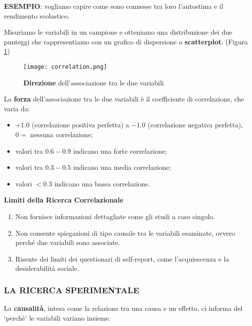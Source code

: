 \documentclass{subfiles}
\begin{document}
        \textbf{ESEMPIO}: vogliamo capire come sono connesse tra loro l'autostima e il rendimento 
        scolastico.

        Misuriamo le variabili in un campione e otteniamo una distribuzione dei due punteggi che 
        rappresentiamo con un grafico di dispersione o \textbf{scatterplot}. (Figura \ref{fig:correlazione})

        \begin{figure}[h]
            \centering
            \texttt{[image: correlation.png]}
            \caption{\textbf{Direzione} dell'associazione tra le due variabili}
            \label{fig:correlazione}
        \end{figure}

        La \textbf{forza} dell'associazione tra le due variabili è il coefficiente di correlazione, 
        che varia da: 

        \begin{itemize}
            \item $+1.0$ (correlazione positiva perfetta) a $-1.0$ (correlazione negativa perfetta), 
            $0 =$ nessuna correlazione;
            \item valori tra $0.6 - 0.9$ indicano una forte correlazione;
            \item valori tra $0.3 - 0.5$ indicano una media correlazione;
            \item valori $< 0.3$ indicano una bassa correlazione.
        \end{itemize}

        \textbf{Limiti della Ricerca Correlazionale}
        \begin{enumerate}
            \item Non fornisce informazioni dettagliate come gli studi a caso singolo.
            \item Non consente spiegazioni di tipo causale tra le variabili esaminate, ovvero 
            perché due variabili sono associate.
            \item Risente dei limiti dei questionari di self-report, come l'acquiescenza e la 
            desiderabilità sociale.
        \end{enumerate}

    \subsubsection*{LA RICERCA SPERIMENTALE}
        La \textbf{causalità}, intesa come la relazione tra una causa e un effetto, ci informa del 
        `perchè' le variabili variano insieme.
\end{document}
